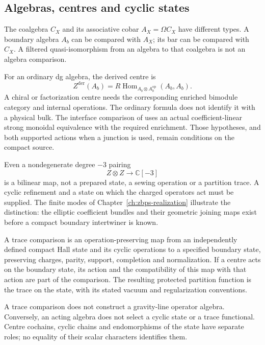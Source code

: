 \subsection{Algebras, centres and cyclic states}
\label{app:G-vol2-residual}

The coalgebra \(C_X\) and its associative cobar
\(A_X=\Omega C_X\) have different types. A boundary algebra
\(A_b\) can be compared with \(A_X\); its bar can be compared
with \(C_X\). A filtered quasi-isomorphism from an algebra to
that coalgebra is not an algebra comparison.

For an ordinary dg algebra, the derived centre is
\[
 Z^{\mathrm{der}}(A_b)
 =R\operatorname{Hom}_{A_b\otimes A_b^{\mathrm{op}}}(A_b,A_b).
\]
A chiral or factorization centre needs the corresponding enriched
bimodule category and internal operations. The ordinary formula
does not identify it with a physical bulk. The interface comparison
of \cite{ChiralBarCobarVolI} uses an actual coefficient-linear
strong monoidal equivalence with the required enrichment. Those
hypotheses, and both supported actions when a junction is used,
remain conditions on the compact source.

Even a nondegenerate degree \(-3\) pairing
\[
 Z\otimes Z\longrightarrow\mathbb C[-3]
\]
is a bilinear map, not a prepared state, a sewing operation or a
partition trace. A cyclic refinement and a state on which the
charged operators act must be supplied. The finite modes of
Chapter~\ref{ch:zbps-realization} illustrate the distinction:
the elliptic coefficient bundles and their geometric joining maps
exist before a compact boundary intertwiner is known.

\begin{definition}
\label{def:G-vol2-hall-borcherds}
A trace comparison is an operation-preserving map from an
independently defined compact Hall state and its cyclic operations
to a specified boundary state, preserving charges, parity, support,
completion and normalization. If a centre acts on the boundary
state, its action and the compatibility of this map with that
action are part of the comparison. The resulting protected
partition function is the trace on the state, with its stated
vacuum and regularization conventions.
\end{definition}

\begin{remark}
\label{rem:G-level-Z-vs-gravity-line}
A trace comparison does not construct a gravity-line operator
algebra. Conversely, an acting algebra does not select a cyclic
state or a trace functional. Centre cochains, cyclic chains and
endomorphisms of the state have separate roles; no equality of
their scalar characters identifies them.
\end{remark}

